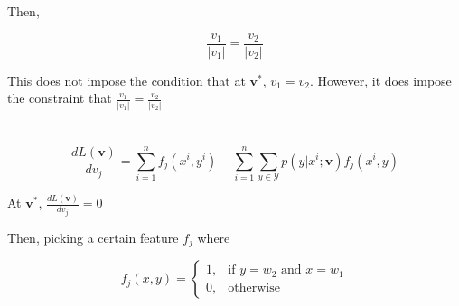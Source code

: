 \documentclass[11pt]{scrartcl}
\newcommand{\vstar}{\ensuremath{\mathbf{v}^*}}
\newcommand{\vvec}{\ensuremath{\mathbf{v}}}
\newcommand{\fvec}{\ensuremath{\mathbf{f}}}
\newcommand{\n}[1]{\ensuremath{\text{#1}}}
\begin{document}
Then, 

\[ \frac{v_1}{|v_1|} = \frac{v_2}{|v_2|} \]

This does not impose the condition that at $\vstar$, $v_1 = v_2$. However, it does impose the constraint that $\frac{v_1}{|v_1|} = \frac{v_2}{|v_2|}$

\section{}

%
%
%
%
%
%
%
%
%

\[ \frac{d L(\vvec)}{d v_j} = \sum_{i=1}^{n} f_j \left(x^i, y^i \right) - \sum_{i=1}^{n} \sum_{y \in \mathcal{Y}} p\left(y | x^i; \vvec \right) f_j \left(x^i, y\right) \]

At $\vstar$, $\frac{d L(\vvec)}{dv_j} = 0$

Then, picking a certain feature $f_j$ where

\[ f_j(x,y) = \begin{cases}
1,& \n{if } y = w_2 \n{ and } x = w_1 \\
0,& \n{otherwise}
\end{cases} \]
\end{document}
